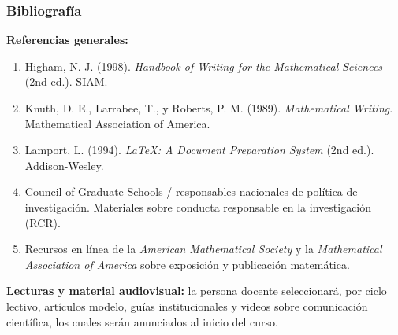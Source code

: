 \begin{refsection}




\subsubsection*{Bibliografía}

\textbf{Referencias generales:}

\begin{enumerate}
\item Higham, N. J. (1998). \emph{Handbook of Writing for the Mathematical Sciences} (2nd ed.). SIAM.
\item Knuth, D. E., Larrabee, T., y Roberts, P. M. (1989). \emph{Mathematical Writing}. Mathematical Association of America.
\item Lamport, L. (1994). \emph{\LaTeX: A Document Preparation System} (2nd ed.). Addison-Wesley.
\item Council of Graduate Schools / responsables nacionales de política de investigación. Materiales sobre conducta responsable en la investigación (RCR).
\item Recursos en línea de la \emph{American Mathematical Society} y la \emph{Mathematical Association of America} sobre exposición y publicación matemática.
\end{enumerate}

\nocite{Kra17}

\textbf{Lecturas y material audiovisual:} la persona docente seleccionará, por ciclo lectivo, artículos modelo, guías institucionales y videos sobre comunicación científica, los cuales serán anunciados al inicio del curso.

\end{refsection}

